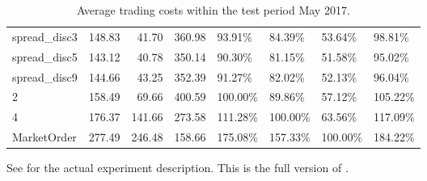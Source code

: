\begin{table}[ht]
{\begin{tabular}{lrrrllll}
spread\_disc3                 &    148.83 &   41.70 &  360.98 &   93.91\% &   84.39\% &   53.64\% &       98.81\% \\
spread\_disc5                 &    143.12 &   40.78 &  350.14 &   90.30\% &   81.15\% &   51.58\% &       95.02\% \\
spread\_disc9                 &    144.66 &   43.25 &  352.39 &   91.27\% &   82.02\% &   52.13\% &       96.04\% \\
2                            &    158.49 &   69.66 &  400.59 &  100.00\% &   89.86\% &   57.12\% &      105.22\% \\
4                            &    176.37 &  141.66 &  273.58 &  111.28\% &  100.00\% &   63.56\% &      117.09\% \\
MarketOrder                  &    277.49 &  246.48 &  158.66 &  175.08\% &  157.33\% &  100.00\% &      184.22\% \\
\bottomrule
\end{tabular}
}

        		\caption[Full version of ]{Average trading costs within the test period May 2017.}
		See  for the actual experiment description. This is the full version of .
		\label{tab:eval:additionalMarketVariables:fixed:fulltable}

\end{table}